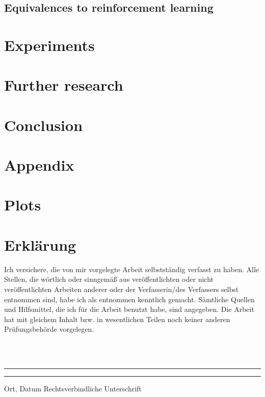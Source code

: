 \documentclass[twoside,11pt]{article}
\begin{document}
\subsection{Equivalences to reinforcement learning}


\section{Experiments}
\label{sec:experiments}


\section{Further research}
\label{sec:further_research}

\section{Conclusion}

\renewcommand{\appendixpagename}{}
\begin{appendices}
  \section*{Appendix}

  \section{Plots}

\end{appendices}



\newpage
\section*{Erklärung}
Ich versichere, die von mir vorgelegte Arbeit
selbstst\"andig verfasst zu haben.
Alle Stellen, die w\"ortlich oder sinngem\"a{\ss} aus
ver\"offentlichten oder nicht ver\"offentlichten Arbeiten
anderer oder der Verfasserin/des Verfassers selbst
entnommen sind, habe ich als entnommen kenntlich gemacht.
S\"amtliche Quellen und Hilfsmittel, die ich für die Arbeit
benutzt habe, sind angegeben.
Die Arbeit hat mit gleichem Inhalt bzw. in wesentlichen
Teilen noch keiner anderen Pr\"ufungsbeh\"orde vorgelegen.

~\\
~\\
\noindent
\rule{0.35\textwidth}{0.4pt}
\hspace*{3cm}
\rule{0.45\textwidth}{0.4pt}
\newline
Ort, Datum	\hspace*{6.3cm}	Rechtsverbindliche Unterschrift
\end{document}
